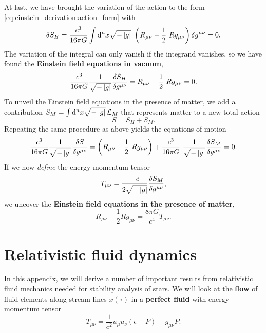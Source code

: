 At last, we have brought the variation of the action to the form \eqref{eq:einstein_derivation:action_form} with
\begin{equation}
	\variation{S_H} = \frac{c^3}{16 \pi G} \int \dif^n x \sqrt{-\det{g}} \left( R_{\mu \nu} - \frac{1}{2} R g_{\mu \nu} \right) \variation{g^{\mu \nu}} = 0 .
\end{equation}
The variation of the integral can only vanish if the integrand vanishes, so we have found the \textbf{Einstein field equations in vacuum},
\begin{equation}
	 \frac{c^3}{16 \pi G} \frac{1}{\sqrt{-\det{g}}} \fdv{S_H}{g^{\mu \nu}} = R_{\mu \nu} - \frac{1}{2} R g_{\mu \nu} = 0 .
	\label{eq:einstein_derivation:einstein_vacuum}
\end{equation}
To unveil the Einstein field equations in the presence of matter, we add a contribution $S_M = \int \mathop{}\!\mathrm{d}^n x \sqrt{-\left\lvert g \right\rvert} \, \mathcal{L}_M$ that represents matter to a new total action
\begin{equation}
	S = S_H + S_M .
\end{equation}
Repeating the same procedure as above yields the equations of motion
\begin{equation}
	\frac{c^3}{16 \pi G} \frac{1}{\sqrt{-\det{g}}} \fdv{S}{g^{\mu \nu}} = \left( R_{\mu \nu} - \frac{1}{2} R g_{\mu \nu} \right) + \frac{c^3}{16 \pi G} \frac{1}{\sqrt{-\det{g}}} \frac{\variation{S_M}}{\variation{g^{\mu \nu}}} = 0 .
\end{equation}
If we now \emph{define} the energy-momentum tensor
\begin{equation}
	T_{\mu \nu} = \frac{-c}{2 \sqrt{-\left\lvert g \right\rvert}} \frac{\delta S_M}{\delta g^{\mu \nu}} ,
\end{equation}
we uncover the \textbf{Einstein field equations in the presence of matter},
\begin{equation}
	R_{\mu \nu} - \frac{1}{2} R g_{\mu \nu} = \frac{8 \pi G}{c^4} T_{\mu \nu} .
	\label{eq:einstein_derivation:einstein_matter}
\end{equation}


\chapter{Relativistic fluid dynamics}
\label{chap:relfluid}

In this appendix, we will derive a number of important results from relativistic fluid mechanics needed for stability analysis of stars.
We will look at the \textbf{flow} of fluid elements along stream lines $x(\tau)$ in a \textbf{perfect fluid} with energy-momentum tensor
\begin{equation}
	T_{\mu \nu} = \frac{1}{c^2} u_\mu u_\nu (\epsilon + P) - g_{\mu \nu} P .
\end{equation}

